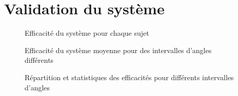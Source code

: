 \documentclass[letterpaper, twoside, 12pt, memoire, creativecommons, hyperref]{thETS}
\begin{document}
\section{Validation du système}

\begin{figure}
	\centering
	\caption{Efficacité du système pour chaque sujet}
	\label{fig:effsujets}
\end{figure}

\begin{figure}
	\centering
	\caption{Efficacité du système moyenne pour des intervalles d'angles différents}
	\label{fig:compeff}
\end{figure}

\begin{figure}
	\centering
	\caption{Répartition et statistiques des efficacités pour différents intervalles d'angles}
	\label{fig:effstats}
\end{figure}
\end{document}
